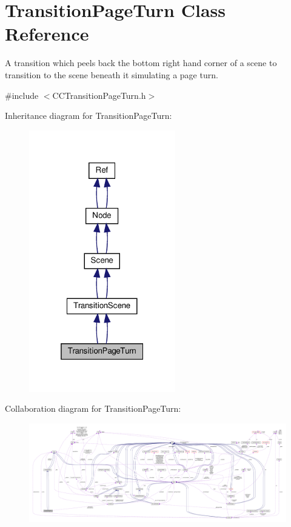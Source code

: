 \hypertarget{classTransitionPageTurn}{}\section{Transition\+Page\+Turn Class Reference}
\label{classTransitionPageTurn}


A transition which peels back the bottom right hand corner of a scene to transition to the scene beneath it simulating a page turn.  




{\ttfamily \#include $<$C\+C\+Transition\+Page\+Turn.\+h$>$}



Inheritance diagram for Transition\+Page\+Turn\+:
\nopagebreak
\begin{figure}[H]
\begin{center}
\leavevmode
\includegraphics[width=181pt]{classTransitionPageTurn__inherit__graph}
\end{center}
\end{figure}


Collaboration diagram for Transition\+Page\+Turn\+:
\nopagebreak
\begin{figure}[H]
\begin{center}
\leavevmode
\includegraphics[width=350pt]{classTransitionPageTurn__coll__graph}
\end{center}
\end{figure}
